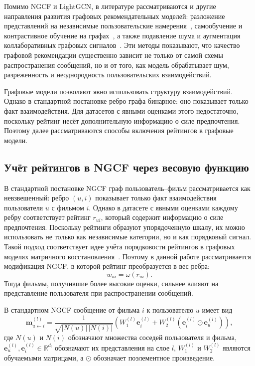 \documentclass[12pt,fleqn]{article}
\begin{document}
Помимо NGCF и LightGCN, в литературе рассматриваются и другие направления развития графовых рекомендательных моделей: разложение представлений на независимые пользовательские намерения~\cite{wang2020dgcf}, самообучение и контрастивное обучение на графах~\cite{wu2021sgl,yu2022simgcl,cai2023lightgcl}, а также подавление шума и аугментация коллаборативных графовых сигналов~\cite{fan2023graphda}. Эти методы показывают, что качество графовой рекомендации существенно зависит не только от самой схемы распространения сообщений, но и от того, как модель обрабатывает шум, разреженность и неоднородность пользовательских взаимодействий.

Графовые модели позволяют явно использовать структуру взаимодействий. Однако в
стандартной постановке ребро графа бинарное: оно показывает только факт
взаимодействия. Для датасетов с явными оценками этого недостаточно, поскольку
рейтинг несёт дополнительную информацию о силе предпочтения. Поэтому далее
рассматриваются способы включения рейтингов в графовые модели.


\subsection{Учёт рейтингов в NGCF через весовую функцию}

В стандартной постановке NGCF граф пользователь--фильм рассматривается как
невзвешенный: ребро $(u,i)$ показывает только факт взаимодействия пользователя
$u$ с фильмом $i$. Однако в датасете с явными оценками каждому ребру
соответствует рейтинг $r_{ui}$, который содержит информацию о силе предпочтения.
Поскольку рейтинги образуют упорядоченную шкалу, их можно использовать не только как независимые категории, но и как порядковый сигнал. Такой подход соответствует идее учёта порядковости рейтингов в графовых моделях матричного восстановления~\cite{lee2024rogmc}. Поэтому в данной работе рассматривается модификация NGCF, в которой рейтинг
преобразуется в вес ребра:
$$
    w_{ui}=\omega(r_{ui}).
$$
Тогда фильмы, получившие более высокие оценки, сильнее влияют на представление
пользователя при распространении сообщений.

В стандартном NGCF сообщение от фильма $i$ к пользователю $u$ имеет вид
$$
    \mathbf{m}^{(l)}_{u\leftarrow i}
    =
    \frac{1}{\sqrt{|N(u)|\,|N(i)|}}
    \left(
        W_1^{(l)}\mathbf{e}^{(l)}_i
        +
        W_2^{(l)}
        \left(
            \mathbf{e}^{(l)}_i\odot \mathbf{e}^{(l)}_u
        \right)
    \right),
$$
где $N(u)$ и $N(i)$ обозначают множества соседей пользователя и фильма,
$\mathbf{e}^{(l)}_u,\mathbf{e}^{(l)}_i\in\mathbb{R}^{d_l}$ обозначают их
представления на слое $l$, $W_1^{(l)}$ и $W_2^{(l)}$ являются обучаемыми матрицами, а
$\odot$ обозначает поэлементное произведение.
\end{document}
